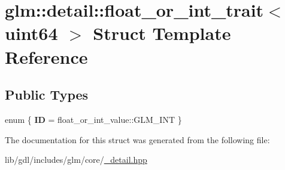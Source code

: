 \hypertarget{structglm_1_1detail_1_1float__or__int__trait_3_01uint64_01_4}{}\section{glm\+:\+:detail\+:\+:float\+\_\+or\+\_\+int\+\_\+trait$<$ uint64 $>$ Struct Template Reference}
\label{structglm_1_1detail_1_1float__or__int__trait_3_01uint64_01_4}
\subsection*{Public Types}
\begin{DoxyCompactItemize}
\item 
\hypertarget{structglm_1_1detail_1_1float__or__int__trait_3_01uint64_01_4_a4b70aa11657e1d76024183a9bc4cc541}{}enum \{ {\bfseries I\+D} = float\+\_\+or\+\_\+int\+\_\+value\+:\+:G\+L\+M\+\_\+\+I\+N\+T
 \}\label{structglm_1_1detail_1_1float__or__int__trait_3_01uint64_01_4_a4b70aa11657e1d76024183a9bc4cc541}

\end{DoxyCompactItemize}


The documentation for this struct was generated from the following file\+:\begin{DoxyCompactItemize}
\item 
lib/gdl/includes/glm/core/\hyperlink{__detail_8hpp}{\+\_\+detail.\+hpp}\end{DoxyCompactItemize}
